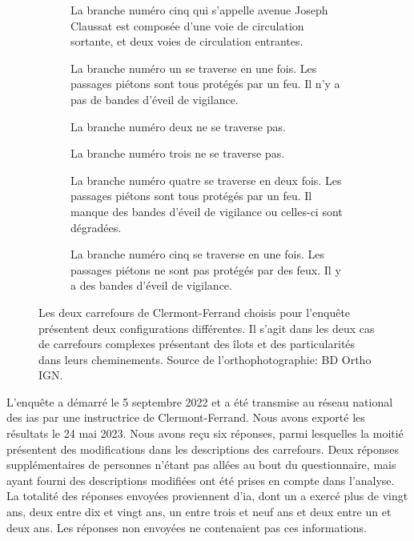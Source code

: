 \begin{figure}
\begin{subfigure}[t]{\linewidth}
\begin{minipage}[t]{0.49\linewidth}
            La branche numéro cinq qui s'appelle avenue Joseph Claussat est composée d'une voie de circulation sortante, et deux voies de circulation entrantes.

            \vspace{5pt}

            La branche numéro un se traverse en une fois. Les passages piétons sont tous protégés par un feu. Il n'y a pas de bandes d'éveil de vigilance.

            \vspace{5pt}

            La branche numéro deux ne se traverse pas.

            \vspace{5pt}

            La branche numéro trois ne se traverse pas.

            \vspace{5pt}

            La branche numéro quatre se traverse en deux fois. Les passages piétons sont tous protégés par un feu. Il manque des bandes d'éveil de vigilance ou celles-ci sont dégradées.

            \vspace{5pt}
            
            La branche numéro cinq se traverse en une fois. Les passages piétons ne sont pas protégés par des feux. Il y a des bandes d'éveil de vigilance.
        \end{minipage}
    \end{subfigure}
    \caption[Carrefours choisis pour l'enquête auprès des instructeurs]{Les deux carrefours de Clermont-Ferrand choisis pour l'enquête présentent deux configurations différentes. Il s'agit dans les deux cas de carrefours complexes présentant des îlots et des particularités dans leurs cheminements. Source de l'orthophotographie: BD Ortho IGN.}
    \label{fig:evaluation_carrefours_enquete}
\end{figure}

\newpar{}

L'enquête a démarré le 5 septembre 2022 et a été transmise au réseau national des \glspl{ia} par une instructrice de Clermont-Ferrand. Nous avons exporté les résultats le 24 mai 2023. Nous avons reçu six réponses, parmi lesquelles la moitié présentent des modifications dans les descriptions des carrefours. Deux réponses supplémentaires de personnes n'étant pas allées au bout du questionnaire, mais ayant fourni des descriptions modifiées ont été prises en compte dans l'analyse. La totalité des réponses envoyées proviennent d'\gls{ia}, dont un a exercé plus de vingt ans, deux entre dix et vingt ans, un entre trois et neuf ans et deux entre un et deux ans. Les réponses non envoyées ne contenaient pas ces informations.

